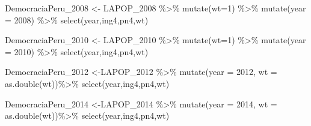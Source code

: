 \documentclass[
]{book}
\newenvironment{Shaded}{\begin{snugshade}}{\end{snugshade}}
\newcommand{\AttributeTok}[1]{\textcolor[rgb]{0.77,0.63,0.00}{#1}}
\newcommand{\DecValTok}[1]{\textcolor[rgb]{0.00,0.00,0.81}{#1}}
\newcommand{\FunctionTok}[1]{\textcolor[rgb]{0.00,0.00,0.00}{#1}}
\newcommand{\NormalTok}[1]{#1}
\newcommand{\OtherTok}[1]{\textcolor[rgb]{0.56,0.35,0.01}{#1}}
\newcommand{\SpecialCharTok}[1]{\textcolor[rgb]{0.00,0.00,0.00}{#1}}
\begin{document}
\begin{Shaded}
\begin{Highlighting}[]
\NormalTok{DemocraciaPeru\_2008 }\OtherTok{\textless{}{-}}\NormalTok{ LAPOP\_2008 }\SpecialCharTok{\%\textgreater{}\%}
  \FunctionTok{mutate}\NormalTok{(}\AttributeTok{wt=}\DecValTok{1}\NormalTok{) }\SpecialCharTok{\%\textgreater{}\%}
  \FunctionTok{mutate}\NormalTok{(}\AttributeTok{year =} \DecValTok{2008}\NormalTok{) }\SpecialCharTok{\%\textgreater{}\%}
  \FunctionTok{select}\NormalTok{(year,ing4,pn4,wt)}
\end{Highlighting}
\end{Shaded}

\begin{Shaded}
\begin{Highlighting}[]
\NormalTok{DemocraciaPeru\_2010 }\OtherTok{\textless{}{-}}\NormalTok{ LAPOP\_2010 }\SpecialCharTok{\%\textgreater{}\%}
  \FunctionTok{mutate}\NormalTok{(}\AttributeTok{wt=}\DecValTok{1}\NormalTok{) }\SpecialCharTok{\%\textgreater{}\%}
  \FunctionTok{mutate}\NormalTok{(}\AttributeTok{year =} \DecValTok{2010}\NormalTok{) }\SpecialCharTok{\%\textgreater{}\%}
  \FunctionTok{select}\NormalTok{(year,ing4,pn4,wt)}
\end{Highlighting}
\end{Shaded}

\begin{Shaded}
\begin{Highlighting}[]
\NormalTok{DemocraciaPeru\_2012 }\OtherTok{\textless{}{-}}\NormalTok{LAPOP\_2012 }\SpecialCharTok{\%\textgreater{}\%}
   \FunctionTok{mutate}\NormalTok{(}\AttributeTok{year =} \DecValTok{2012}\NormalTok{, }\AttributeTok{wt =} \FunctionTok{as.double}\NormalTok{(wt))}\SpecialCharTok{\%\textgreater{}\%}
  \FunctionTok{select}\NormalTok{(year,ing4,pn4,wt)}
\end{Highlighting}
\end{Shaded}

\begin{Shaded}
\begin{Highlighting}[]
\NormalTok{DemocraciaPeru\_2014 }\OtherTok{\textless{}{-}}\NormalTok{LAPOP\_2014 }\SpecialCharTok{\%\textgreater{}\%}
   \FunctionTok{mutate}\NormalTok{(}\AttributeTok{year =} \DecValTok{2014}\NormalTok{, }\AttributeTok{wt =} \FunctionTok{as.double}\NormalTok{(wt))}\SpecialCharTok{\%\textgreater{}\%}
  \FunctionTok{select}\NormalTok{(year,ing4,pn4,wt)}
\end{Highlighting}
\end{Shaded}
\end{document}
